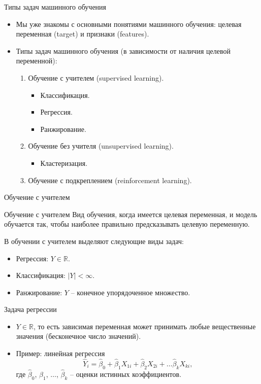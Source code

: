 \documentclass[c, handout]{beamer} %
\def \R{\mathbb{R}}
\begin{document}
	\begin{frame}{Типы задач машинного обучения}
		\begin{itemize}
			\item<1-> Мы уже знакомы с основными понятиями машинного обучения: целевая переменная (target) и признаки (features).
			\item<2-> Типы задач машинного обучения (в зависимости от наличия целевой переменной):
			\begin{enumerate}
				\item Обучение с учителем (supervised learning).
					\begin{itemize}
						\item \alert{Классификация}.
						\item \alert{Регрессия}.
						\item Ранжирование.
					\end{itemize}
				\item Обучение без учителя (unsupervised learning).
					\begin{itemize}
						\item \alert{Кластеризация}.
					\end{itemize}
				\item Обучение с подкреплением (reinforcement learning).
			\end{enumerate}
		\end{itemize}
	\end{frame}

	\begin{frame}{Обучение с учителем}
		\begin{block}{Обучение с учителем}
			Вид обучения, когда имеется целевая переменная, и модель обучается так, чтобы наиболее правильно предсказывать целевую переменную.  
		\end{block}
	\vspace{0.7cm}
	В обучении с учителем выделяют следующие виды задач:
	\begin{itemize}
		\item Регрессия: $Y \in \R$.
		\item Классификация: $|Y| < \infty$.
		\item Ранжирование: $Y$ – конечное упорядоченное множество.
 	\end{itemize}
	\end{frame}

	\begin{frame}{Задача регрессии}
		\begin{itemize}
			\item<1-> $Y \in \R$, то есть зависимая переменная может принимать любые вещественные значения (бесконечное число значений).
			\item<2-> Пример: линейная регрессия
			\[
			\hat{Y}_i = \hat{\beta}_0 + \hat{\beta}_1X_{1i} + \hat{\beta}_2X_{2i} + \ldots \hat{\beta}_kX_{ki},
			\]
			где $\hat{\beta}_0$, $\hat{\beta}_1$, $\ldots$, $\hat{\beta}_k$ – оценки истинных коэффициентов.
		\end{itemize}
	\end{frame}
	
\end{document}
